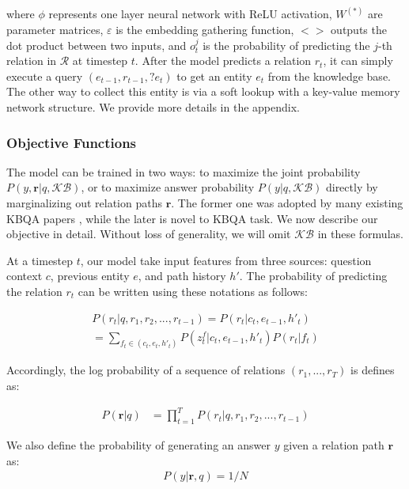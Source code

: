 where $\phi$ represents one layer neural network with ReLU activation, $W^{(*)}$ are parameter matrices, $\varepsilon$ is the embedding gathering function, $<>$ outputs the dot product between two inputs, and $o_t^j$ is the probability of predicting the $j$-th relation in $\mathcal{R}$ at timestep $t$. After the model predicts a relation $r_t$, it can simply execute a query $(e_{t-1}, r_{t-1}, ?e_t)$ to get an entity $e_t$ from the knowledge base. The other way to collect this entity is via a soft lookup with a key-value memory network structure. We provide more details in the appendix.


\subsubsection{Objective Functions}
The model can be trained in two ways: to maximize the joint probability $P(y,\mathbf{r}|q,\mathcal{KB})$, or to maximize answer probability $P(y|q,\mathcal{KB})$ directly by marginalizing out relation paths $\mathbf{r}$. The former one was adopted by many existing KBQA papers \cite{DBLP:conf/coling/ZhouHZ18}, while the later is novel to KBQA task. We now describe our objective in detail. Without loss of generality, we will omit $\mathcal{KB}$ in these formulas.

At a timestep $t$, our model take input features from three sources: question context $c$, previous entity $e$, and path history $h'$. The probability of predicting the relation $r_t$ can be written using these notations as follows:


\begin{equation}
\begin{aligned}
P(r_t|q,r_1,r_2,...,r_{t-1}) = P(r_t|c_t, e_{t-1}, h'_t) \\
       = \sum_{f_t \in (c_t,e_t,h'_t)}P(z_t^f|c_t,e_{t-1},h'_t)P(r_t|f_t)
\end{aligned}
\end{equation}

Accordingly, the log probability of a sequence of relations $(r_1,...,r_{T})$ is defines as:

\begin{equation}
\begin{aligned}
P(\mathbf{r}|q) &= \prod_{t=1}^{T} P(r_t|q,r_1,r_2,...,r_{t-1}) 
\end{aligned}
\end{equation}

We also define the probability of generating an answer $y$ given a relation path $\mathbf{r}$ as:
\begin{align}
P(y|\mathbf{r},q) = 1/N
\end{align}

